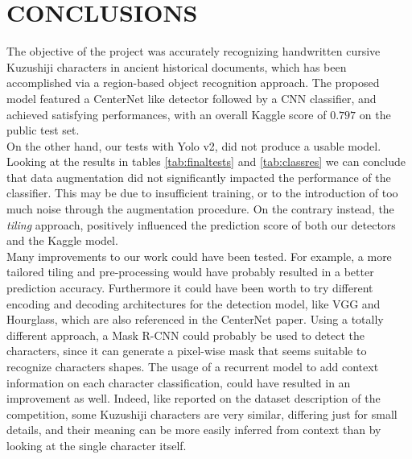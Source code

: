 \section{CONCLUSIONS}
\label{sec:conclusions}

The objective of the project was accurately recognizing handwritten cursive Kuzushiji characters in ancient historical documents, which has been accomplished via a region-based object recognition approach. The proposed model featured a CenterNet like detector followed by a CNN classifier, and achieved satisfying performances, with an overall Kaggle score of $0.797$ on the public test set.\\
On the other hand, our tests with Yolo v2, did not produce a usable model.\\ Looking at the results in tables \ref{tab:finaltests} and \ref{tab:classres} we can conclude that data augmentation did not significantly impacted the performance of the classifier. This may be due to insufficient training, or to the introduction of too much noise through the augmentation procedure. On the contrary instead, the \textit{tiling} approach, positively influenced the prediction score of both our detectors and the Kaggle model. \\
Many improvements to our work could have been tested. For example, a more tailored tiling and pre-processing would have probably resulted in a better prediction accuracy. Furthermore it could have been worth to try different encoding and decoding architectures for the detection model, like VGG and Hourglass, which are also referenced in the CenterNet paper. Using a totally different approach, a Mask R-CNN could probably be used to detect the characters, since it can generate a pixel-wise mask that seems suitable to recognize characters shapes. The usage of a recurrent model to add context information on each character classification, could have resulted in an improvement as well. Indeed, like reported on the dataset description of the competition, some Kuzushiji characters are very similar, differing just for small details, and their meaning can be more easily inferred from context than by looking at the single character itself.
